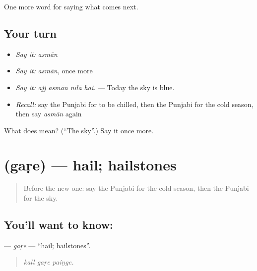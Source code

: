 \begin{grammarlens}[title={What you've built}]
One more word for saying what comes next.
\end{grammarlens}

\subsection*{Your turn}
\begin{itemize}
\raggedright
  \item \emph{Say it:} \emph{asmān}
  \item \emph{Say it:} \emph{asmān}, once more
  \item \emph{Say it:} \emph{ajj asmān nīlā hai.} — Today the sky is blue.
  \item \emph{Recall:} say the Punjabi for to be chilled, then the Punjabi for the cold season, then say \emph{asmān} again
\end{itemize}

\begin{tcolorbox}[breakable,colback=teal!4,colframe=teal!35!black,title={Before you move on}]
What does  mean? (\textquotedblleft{}The sky\textquotedblright{}.) Say it once more.
\end{tcolorbox}
\section[\texorpdfstring{\pa{ਗੜੇ} (gaṛe)}{ਗੜੇ (gaṛe)}]{ (gaṛe) — hail; hailstones}

\label{lesson:PA-C290-gare}



\begin{quote}
Before the new one: say the Punjabi for the cold season, then the Punjabi for the sky.
\end{quote}

\subsection*{You'll want to know: }
\textbf{} — \emph{gaṛe} — \textquotedblleft{}hail; hailstones\textquotedblright{}.

\begin{quote}
  
\end{quote}

\begin{quote}
\emph{kall gaṛe paiṇge.}
\end{quote}

